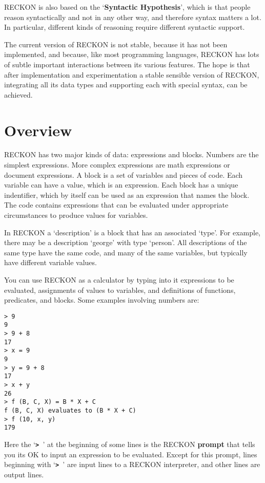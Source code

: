 \documentclass[12pt]{article}
\newcommand{\TT}[1]{{\tt \bfseries #1}}
\newcommand{\key}[1]{{\rm \bfseries #1}}
\newenvironment{indpar}[1][0.3in]%
	{\begin{list}{}%
		     {\setlength{\itemsep}{0in}%
		      \setlength{\topsep}{0in}%
		      \setlength{\parsep}{1ex}%
		      \setlength{\labelwidth}{#1}%
		      \setlength{\leftmargin}{#1}%
		      \addtolength{\leftmargin}{\labelsep}}%
	 \item}%
	{\end{list}}
\begin{document}
RECKON is also based on the `\key{Syntactic Hypothesis}', which is that
people reason syntactically and not in any other way, and therefore
syntax matters a lot.  In particular, different kinds of reasoning
require different syntactic support.

The current version of RECKON is not stable, because it has not been
implemented, and because, like most programming languages, RECKON
has lots of subtle important interactions between its various features.  The
hope is that after implementation and experimentation a stable sensible
version of RECKON, integrating all its data types and supporting each
with special syntax, can be achieved.

\section{Overview}

RECKON has two major kinds of data: expressions and blocks.  Numbers are
the simplest expressions.  More complex expressions are math
expressions or document expressions.  A block is a set of variables
and pieces of code.  Each variable can have a value, which is an expression.
Each block has a unique indentifier, which by itself can be used as
an expression that names the block.
The code contains expressions that can be evaluated under appropriate
circumstances to produce values for variables.

In RECKON a `description' is a block that has an associated `type'.  For
example, there may be a description `george' with type `person'.  All
descriptions of the same type have the same code,
and many of the same variables,
but typically have different variable values.

You can use RECKON as a calculator by typing into it expressions to
be evaluated, assignments of values to variables, and definitions
of functions, predicates, and blocks.  Some examples involving numbers are:

\begin{indpar}\begin{verbatim}
> 9
9
> 9 + 8
17
> x = 9
9
> y = 9 + 8
17
> x + y
26
> f (B, C, X) = B * X + C
f (B, C, X) evaluates to (B * X + C)
> f (10, x, y)
179
\end{verbatim}\end{indpar}

Here the `\TT{>~}' at the beginning of some lines is the RECKON \key{prompt}
that tells you its OK to input an expression to be evaluated.
Except for this prompt, lines beginning with `\TT{> }' are input lines to
a RECKON interpreter, and other lines are output lines.
\end{document}
